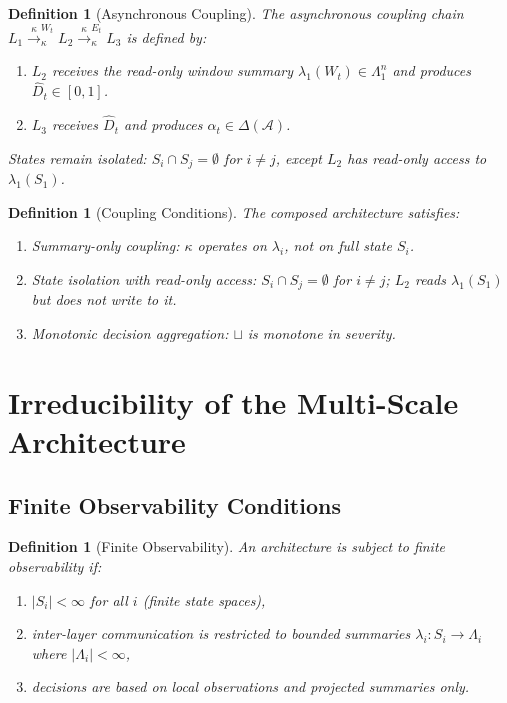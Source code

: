 \documentclass[11pt]{article}
\newtheorem{definition}[theorem]{Definition}
\newcommand{\Agents}{\mathcal{A}}
\newcommand{\Dhat}{\widehat{D}}
\newcommand{\State}[1]{S_{#1}}
\newcommand{\Sum}[1]{\lambda_{#1}}
\newcommand{\Layer}[1]{L_{#1}}
\newcommand{\AsyncComp}{\xrightarrow{\kappa}}
\newcommand{\join}{\sqcup}
\begin{document}
\begin{definition}[Asynchronous Coupling]
\label{def:async}
The \emph{asynchronous coupling chain} $\Layer{1} \AsyncComp^{W_t}_\kappa \Layer{2} \AsyncComp^{E_t}_\kappa \Layer{3}$ is defined by:
\begin{enumerate}[label=(\roman*),noitemsep]
  \item $\Layer{2}$ receives the read-only window summary $\Sum{1}(W_t) \in \Lambda_1^n$ and produces $\Dhat_t \in [0,1]$.
  \item $\Layer{3}$ receives $\Dhat_t$ and produces $\alpha_t \in \Delta(\Agents)$.
\end{enumerate}
States remain isolated: $\State{i} \cap \State{j} = \emptyset$ for $i \neq j$, except $\Layer{2}$ has read-only access to $\Sum{1}(\State{1})$.
\end{definition}

\begin{definition}[Coupling Conditions]
\label{def:coupling}
The composed architecture satisfies:
\begin{enumerate}[label=(C\arabic*),noitemsep]
  \item \textit{Summary-only coupling}: $\kappa$ operates on $\Sum{i}$, not on full state $\State{i}$.
  \item \textit{State isolation with read-only access}: $\State{i} \cap \State{j} = \emptyset$ for $i \neq j$; $\Layer{2}$ reads $\Sum{1}(\State{1})$ but does not write to it.
  \item \textit{Monotonic decision aggregation}: $\join$ is monotone in severity.
\end{enumerate}
\end{definition}

\section{Irreducibility of the Multi-Scale Architecture}
\label{sec:irreducibility}

\subsection{Finite Observability Conditions}

\begin{definition}[Finite Observability]
\label{def:finite-obs}
An architecture is subject to \emph{finite observability} if:
\begin{enumerate}[label=(FO\arabic*),noitemsep]
  \item $|\State{i}| < \infty$ for all $i$ (finite state spaces),
  \item inter-layer communication is restricted to bounded summaries $\Sum{i}: \State{i} \to \Lambda_i$ where $|\Lambda_i| < \infty$,
  \item decisions are based on local observations and projected summaries only.
\end{enumerate}
\end{definition}
\end{document}
